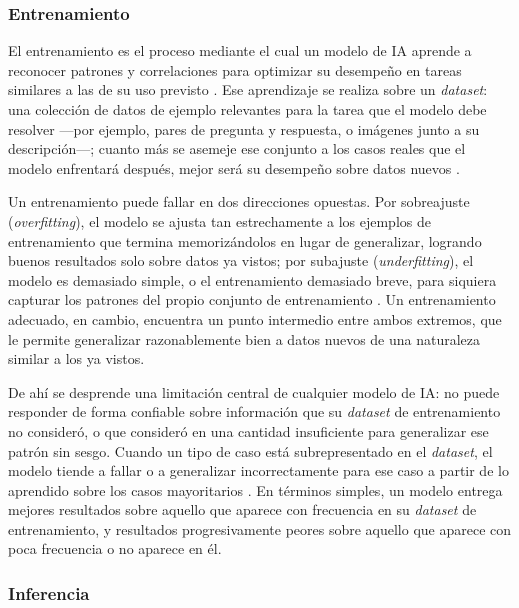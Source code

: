 \subsubsection{Entrenamiento}

El entrenamiento es el proceso mediante el cual un modelo de IA aprende a reconocer patrones y correlaciones para optimizar su desempeño en tareas similares a las de su uso previsto \cite{ibmmodeltraining}. Ese aprendizaje se realiza sobre un \textit{dataset}: una colección de datos de ejemplo relevantes para la tarea que el modelo debe resolver —por ejemplo, pares de pregunta y respuesta, o imágenes junto a su descripción—; cuanto más se asemeje ese conjunto a los casos reales que el modelo enfrentará después, mejor será su desempeño sobre datos nuevos \cite{ibmtrainingdata}.

Un entrenamiento puede fallar en dos direcciones opuestas. Por sobreajuste (\textit{overfitting}), el modelo se ajusta tan estrechamente a los ejemplos de entrenamiento que termina memorizándolos en lugar de generalizar, logrando buenos resultados solo sobre datos ya vistos; por subajuste (\textit{underfitting}), el modelo es demasiado simple, o el entrenamiento demasiado breve, para siquiera capturar los patrones del propio conjunto de entrenamiento \cite{ibmoverfitting}. Un entrenamiento adecuado, en cambio, encuentra un punto intermedio entre ambos extremos, que le permite generalizar razonablemente bien a datos nuevos de una naturaleza similar a los ya vistos.

De ahí se desprende una limitación central de cualquier modelo de IA: no puede responder de forma confiable sobre información que su \textit{dataset} de entrenamiento no consideró, o que consideró en una cantidad insuficiente para generalizar ese patrón sin sesgo. Cuando un tipo de caso está subrepresentado en el \textit{dataset}, el modelo tiende a fallar o a generalizar incorrectamente para ese caso a partir de lo aprendido sobre los casos mayoritarios \cite{ibmdatabias}. En términos simples, un modelo entrega mejores resultados sobre aquello que aparece con frecuencia en su \textit{dataset} de entrenamiento, y resultados progresivamente peores sobre aquello que aparece con poca frecuencia o no aparece en él.

\subsubsection{Inferencia}

